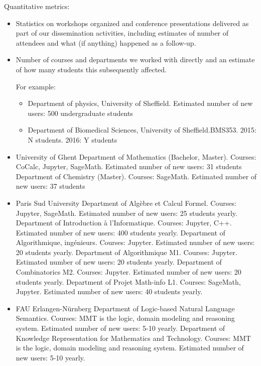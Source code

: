 \begin{Aim 1}
\begin{Aim 2}
Quantitative metrics:
\begin{itemize}
\item Statistics on workshops organized and conference presentations delivered as part of our dissemination activities, including estimates of number of attendees and what (if anything) happened as a follow-up.
\item Number of courses and departments we worked with directly and an estimate of how many students this subsequently affected.

  For example:
  \begin{itemize}
  \item Department of physics, University of Sheffield. Estimated number of new users: 500 undergraduate students
  \item Department of Biomedical Sciences, University of Sheffield.BMS353. 2015: N students. 2016: Y students
  \end{itemize}
\end{itemize}

\begin{itemize}
  \item University of Ghent
  Department of Mathematics (Bachelor, Master). Courses: CoCalc, Jupyter, SageMath. Estimated number of new users: 31 students
  Department of Chemistry (Master). Courses: SageMath. Estimated number of new users: 37 students
  
  \item Paris Sud University 
  Department of Algèbre et Calcul Formel. Courses: Jupyter, SageMath. Estimated number of new users: 25 students yearly.
  Department of Introduction à l'Informatique. Courses: Jupyter, C++. Estimated number of new users: 400 students yearly.
  Department of Algorithmique, ingénieurs. Courses: Jupyter. Estimated number of new users: 20 students yearly.
  Department of Algorithmique M1. Courses: Jupyter. Estimated number of new users: 20 students yearly.
  Department of Combinatorics M2. Courses: Jupyter. Estimated number of new users: 20 students yearly.
  Department of Projet Math-info L1. Courses: SageMath, Jupyter. Estimated number of new users: 40 students yearly.
  
  \item FAU Erlangen-Nürnberg
  Department of Logic-based Natural Language Semantics. Courses: MMT is the logic, domain modeling and reasoning system. Estimated number of new users: 5-10 yearly. 
  Department of Knowledge Representation for Mathematics and Technology. Courses: MMT is the logic, domain modeling and reasoning system. Estimated number of new users: 5-10 yearly. 
 

\end{itemize}
\end{Aim 2}
\end{Aim 1}
